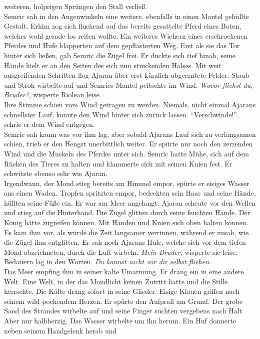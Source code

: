 weiteren, holprigen Sprüngen den Stall verließ.\\
Semric sah in den Augenwinkeln eine weitere, ebenfalls in einen Mantel gehüllte Gestalt. Erhim zog 
sich fluchend auf das bereits gesattelte Pferd eines Boten, welcher wohl gerade los reiten wollte. 
Ein weiteres Wiehern eines erschrockenen Pferdes und Hufe klapperten auf dem gepflasterten Weg. 
Erst als sie das Tor hinter sich ließen, gab Semric die Zügel frei. Er duckte sich tief hinab, 
seine Hände hielt er an den Seiten des sich nun streckenden Halses. Mit weit ausgreifenden 
Schritten flog Ajaran über erst kürzlich abgeerntete Felder. Staub und Stroh wirbelte auf und 
Semrics Mantel peitschte im Wind. \textit{Wovor fliehst du, Bruder?}, wisperte Riolean leise.\\
Ihre Stimme schien vom Wind getragen zu werden. Niemals, nicht einmal Ajarans schnellster Lauf, 
konnte den Wind hinter sich zurück lassen. ``Verschwinde!'', schrie er dem Wind entgegen. \\
Semric sah kaum was vor ihm lag, aber sobald Ajarans Lauf sich zu verlangsamen schien, trieb er den 
Hengst unerbittlich weiter. Er spürte nur noch den zerrenden Wind und die Muskeln des Pferdes unter 
sich. Semric hatte Mühe, sich auf dem Rücken des Tieres zu halten und klammerte sich mit seinen 
Knien fest. Er schwitzte ebenso sehr wie Ajaran. \\
Irgendwann, der Mond stieg bereits am Himmel empor, spürte er eisiges Wasser ans einen Waden. 
Tropfen spritzten empor, bedeckten sein Haar und seine Hände, hüllten seine Füße ein. Er war am 
Meer angelangt. Ajaran scheute vor den Wellen und stieg auf die Hinterhand. Die Zügel glitten durch 
seine feuchten Hände. Der König hätte zugreifen können. Mit Händen und Knien sich oben halten 
können. Es kam ihm vor, als würde die Zeit langsamer verrinnen, während er zusah, wie die Zügel ihm 
entglitten. Er sah noch Ajarans Hufe, welche sich vor dem tiefen Mond abzeichneten, durch die Luft 
wirbeln.
\textit{Mein Bruder}, wisperte sie leise. Bedauern lag in den Worten. \textit{Du kannst nicht vor 
dir selbst fliehen.}\\
Das Meer empfing ihm in seiner kalte Umarmung. Er drang ein in eine andere Welt. Eine Welt, in der 
das Mondlicht keinen Zutritt hatte und die Stille herrschte. Die Kälte drang sofort in seine 
Glieder. Eisige Klauen griffen nach seinem wild pochendem Herzen. Er spürte den Aufprall am Grund. 
Der grobe Sand des Strandes wirbelte auf und seine Finger suchten vergebens nach Halt. Aber nur 
halbherzig. Das Wasser wirbelte um ihn herum. Ein Huf donnerte neben seinem Handgelenk herab und 
